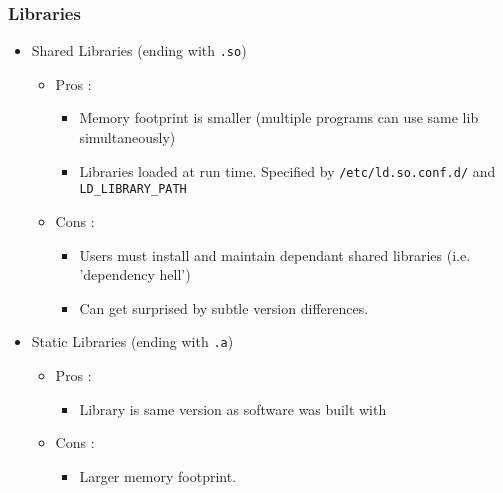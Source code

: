 \documentclass{beamer}
\newcommand{\code}[1]{\colorbox{codegray}{\texttt{#1}}}
\begin{document}
\begin{frame}
\frametitle{Libraries}
\begin{itemize}
    \item Shared Libraries (ending with \code{.so})
    \pause
    \begin{itemize}
        \item Pros : 
        \begin{itemize}
            \item Memory footprint is smaller (multiple programs can use same lib simultaneously)
            \pause
            \item Libraries loaded at run time. Specified by \code{/etc/ld.so.conf.d/} and \code{LD\_LIBRARY\_PATH}
            \bigskip
            \pause
        \end{itemize}
        \item Cons : 
        \begin{itemize}
            \item Users must install and maintain dependant shared libraries (i.e. 'dependency hell')
            \pause
            \item Can get surprised by subtle version differences.
        \end{itemize}
        \bigskip
    \pause
    \end{itemize}
    \item Static Libraries (ending with \code{.a})
    \pause
    \begin{itemize}
        \item Pros : 
        \begin{itemize}
            \item Library is same version as software was built with
            \bigskip
            \pause
        \end{itemize}
        \item Cons : 
        \begin{itemize}
            \item Larger memory footprint.
        \end{itemize}
    \end{itemize}
\end{itemize}
\end{frame}
\end{document}
